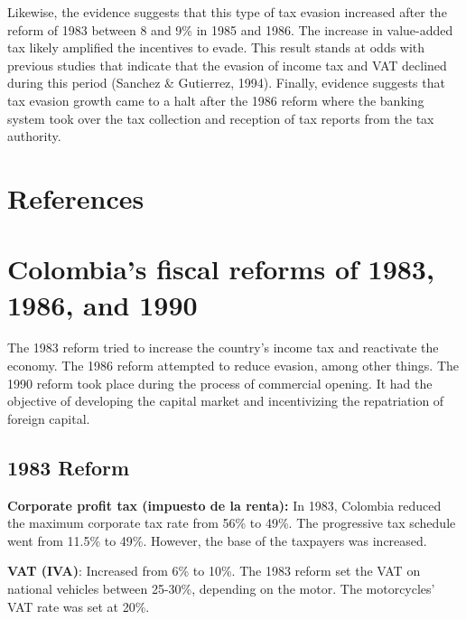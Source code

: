 \documentclass[
  12pt]{article}
\newlength{\cslhangindent}
\newlength{\cslentryspacingunit} %
\newenvironment{CSLReferences}[2] %
 {%
  \setlength{\parindent}{0pt}
  \ifodd #1
  \let\oldpar\par
  \def\par{\hangindent=\cslhangindent\oldpar}
  \fi
  \setlength{\parskip}{#2\cslentryspacingunit}
 }%
 {}
\theoremstyle{definition}
\theoremstyle{remark}
\begin{document}
Likewise, the evidence suggests that this type of tax evasion increased
after the reform of 1983 between 8 and 9\% in 1985 and 1986. The
increase in value-added tax likely amplified the incentives to evade.
This result stands at odds with previous studies that indicate that the
evasion of income tax and VAT declined during this period (Sanchez \&
Gutierrez, 1994). Finally, evidence suggests that tax evasion growth
came to a halt after the 1986 reform where the banking system took over
the tax collection and reception of tax reports from the tax authority.

\hypertarget{references}{%
\section*{References}\label{references}}

\hypertarget{refs}{}
\begin{CSLReferences}{0}{0}
\end{CSLReferences}

\hypertarget{colombias-fiscal-reforms-of-1983-1986-and-1990}{%
\section*{Colombia's fiscal reforms of 1983, 1986, and
1990}\label{colombias-fiscal-reforms-of-1983-1986-and-1990}}

The 1983 reform tried to increase the country's income tax and
reactivate the economy. The 1986 reform attempted to reduce evasion,
among other things. The 1990 reform took place during the process of
commercial opening. It had the objective of developing the capital
market and incentivizing the repatriation of foreign capital.

\hypertarget{reform}{%
\subsection{1983 Reform}\label{reform}}

\textbf{Corporate profit tax (impuesto de la renta):} In 1983, Colombia
reduced the maximum corporate tax rate from 56\% to 49\%. The
progressive tax schedule went from 11.5\% to 49\%. However, the base of
the taxpayers was increased.

\textbf{VAT (IVA)}: Increased from 6\% to 10\%. The 1983 reform set the
VAT on national vehicles between 25-30\%, depending on the motor. The
motorcycles' VAT rate was set at 20\%.
\end{document}
